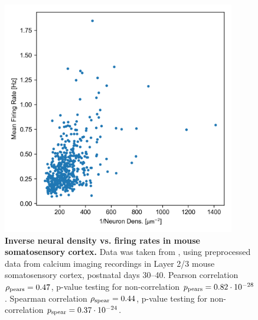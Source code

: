 \documentclass[10pt,letterpaper]{article}
\begin{document}
\begin{figure}
\centering
\includegraphics[width=4in]{./figures/inv_dens_vs_fir_rates.png}
\caption{{\bf Inverse neural density vs. firing rates in mouse somatosensory cortex.} Data was taken from \cite{Goncalves_2013,Goncalves_2017}, using preprocessed data from calcium imaging recordings in Layer 2/3 mouse somatosensory cortex, postnatal days 30--40. Pearson correlation $\rho_{\rm pears} = 0.47$, p-value testing for non-correlation $p_{\rm pears}=0.82\cdot 10^{-28}$. Spearman correlation $\rho_{\rm spear} = 0.44$, p-value testing for non-correlation $p_{\rm spear}=0.37\cdot 10^{-24}$.}
\label{experimental_data}
\end{figure}
\end{document}
